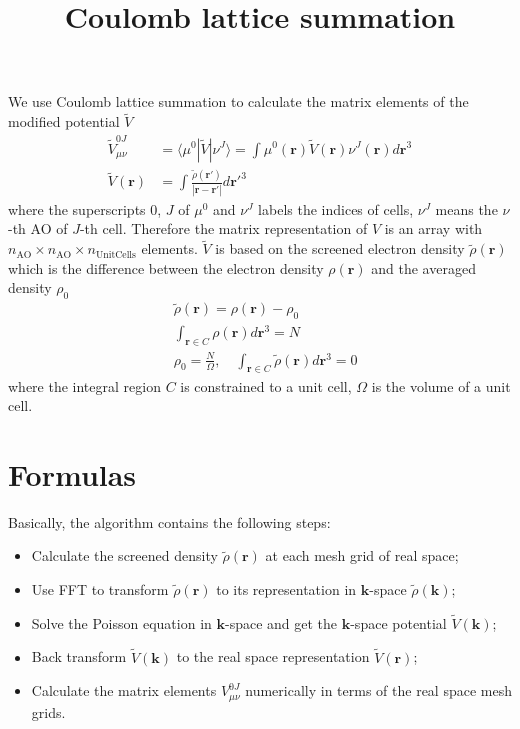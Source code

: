 \documentclass{article}
\begin{document}
\title{Coulomb lattice summation}
\author{}
\maketitle

We use Coulomb lattice summation to calculate the matrix elements of the
modified potential $\tilde{V}$
\begin{align}
  \tilde{V}_{\mu\nu}^{0J}
  &=\langle \mu^0|\tilde{V}|\nu^J\rangle
  =\int \mu^0(\mathbf{r}) \tilde{V}(\mathbf{r}) \nu^J(\mathbf{r}) d\mathbf{r}^3
  \\
  \tilde{V}(\mathbf{r})
  &=\int \frac{\tilde{\rho}(\mathbf{r}')}{|\mathbf{r}-\mathbf{r}'|}
  d{\mathbf{r}'}^3
  \label{}
\end{align}
where the superscripts $0$, $J$ of $\mu^0$ and $\nu^J$ labels the indices of
cells, $\nu^J$ means the $\nu$-th AO of $J$-th cell.
Therefore the matrix representation of $V$ is an array with 
$n_\text{AO} \times n_\text{AO} \times n_\text{UnitCells}$ elements.
$\tilde{V}$ is based on the screened electron density $\tilde{\rho}(\mathbf{r})$
which is the difference between the electron density $\rho(\mathbf{r})$ and
the averaged density $\rho_0$
\begin{align}
  &\tilde{\rho}(\mathbf{r})
  =\rho(\mathbf{r}) - \rho_0
  \\
  &\int_{\mathbf{r}\in C} \rho(\mathbf{r}) d\mathbf{r}^3 = N
  \\
  &\rho_0 = \frac{N}{\Omega},\quad
  \int_{\mathbf{r}\in C} \tilde{\rho}(\mathbf{r}) d\mathbf{r}^3 = 0
  \label{}
\end{align}
where the integral region $C$ is constrained to a unit cell,
$\Omega$ is the volume of a unit cell.

\section{Formulas}
Basically, the algorithm contains the following steps:
\begin{itemize}
  \item Calculate the screened density $\tilde{\rho}(\mathbf{r})$ at each mesh
    grid of real space;
  \item Use FFT to transform $\tilde{\rho}(\mathbf{r})$ to its representation
    in $\mathbf{k}$-space $\tilde{\rho}(\mathbf{k})$;
  \item Solve the Poisson equation in $\mathbf{k}$-space and get the
    $\mathbf{k}$-space potential $\tilde{V}(\mathbf{k})$;
  \item Back transform $\tilde{V}(\mathbf{k})$ to the real space
    representation $\tilde{V}(\mathbf{r})$;
  \item Calculate the matrix elements $V_{\mu\nu}^{0J}$ numerically in terms
    of the real space mesh grids.
\end{itemize}
\end{document}
